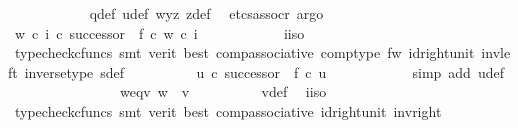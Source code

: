 \begin{isabellebody}
\ \ \ \ \ \ \ \ \ \ \isamarkupfalse%
\ q{\isacharunderscore}{\kern0pt}def\ u{\isacharunderscore}{\kern0pt}def\ w{\isacharunderscore}{\kern0pt}y{\isacharunderscore}{\kern0pt}z\ z{\isacharunderscore}{\kern0pt}def\ \isamarkupfalse%
\ {\isacharparenleft}{\kern0pt}etcs{\isacharunderscore}{\kern0pt}assocr{\isacharcomma}{\kern0pt}\ argo{\isacharparenright}{\kern0pt}\isanewline
\ \ \ \ \ \ \ \ \isamarkupfalse%
\ {\isachardoublequoteopen}{\isacharparenleft}{\kern0pt}w\ {\isasymcirc}\isactrlsub c\ i{\isacharparenright}{\kern0pt}\ {\isasymcirc}\isactrlsub c\ successor\ {\isacharequal}{\kern0pt}\ f\ {\isasymcirc}\isactrlsub c\ w\ {\isasymcirc}\isactrlsub c\ i{\isachardoublequoteclose}\isanewline
\ \ \ \ \ \ \ \ \ \ \isamarkupfalse%
\ i{\isacharunderscore}{\kern0pt}iso\ \isamarkupfalse%
\ {\isacharparenleft}{\kern0pt}typecheck{\isacharunderscore}{\kern0pt}cfuncs{\isacharcomma}{\kern0pt}\ smt\ {\isacharparenleft}{\kern0pt}verit{\isacharcomma}{\kern0pt}\ best{\isacharparenright}{\kern0pt}\ comp{\isacharunderscore}{\kern0pt}associative{}\ comp{\isacharunderscore}{\kern0pt}type\ f{\isacharunderscore}{\kern0pt}w\ id{\isacharunderscore}{\kern0pt}right{\isacharunderscore}{\kern0pt}unit{}\ inv{\isacharunderscore}{\kern0pt}left\ inverse{\isacharunderscore}{\kern0pt}type\ s{\isacharunderscore}{\kern0pt}def{\isacharparenright}{\kern0pt}\isanewline
\ \ \ \ \ \ \ \ \isamarkupfalse%
\ {\isachardoublequoteopen}u\ {\isasymcirc}\isactrlsub c\ successor\ {\isacharequal}{\kern0pt}\ f\ {\isasymcirc}\isactrlsub c\ u{\isachardoublequoteclose}\isanewline
\ \ \ \ \ \ \ \ \ \ \isamarkupfalse%
\ {\isacharparenleft}{\kern0pt}simp\ add{\isacharcolon}{\kern0pt}\ u{\isacharunderscore}{\kern0pt}def{\isacharparenright}{\kern0pt}\isanewline
\ \ \ \ \ \ \isamarkupfalse%
\isanewline
\ \ \ \ \ \ \isamarkupfalse%
\ \isamarkupfalse%
\ w{\isacharunderscore}{\kern0pt}eq{\isacharunderscore}{\kern0pt}v{\isacharcolon}{\kern0pt}\ {\isachardoublequoteopen}w\ {\isacharequal}{\kern0pt}\ v{\isachardoublequoteclose}\isanewline
\ \ \ \ \ \ \ \ \isamarkupfalse%
\ v{\isacharunderscore}{\kern0pt}def\ \isamarkupfalse%
\ i{\isacharunderscore}{\kern0pt}iso\isanewline
\ \ \ \ \ \ \ \ \isamarkupfalse%
\ {\isacharparenleft}{\kern0pt}typecheck{\isacharunderscore}{\kern0pt}cfuncs{\isacharcomma}{\kern0pt}\ smt\ {\isacharparenleft}{\kern0pt}verit{\isacharcomma}{\kern0pt}\ best{\isacharparenright}{\kern0pt}\ comp{\isacharunderscore}{\kern0pt}associative{}\ id{\isacharunderscore}{\kern0pt}right{\isacharunderscore}{\kern0pt}unit{}\ inv{\isacharunderscore}{\kern0pt}right{\isacharparenright}{\kern0pt}\isanewline

\end{isabellebody}

